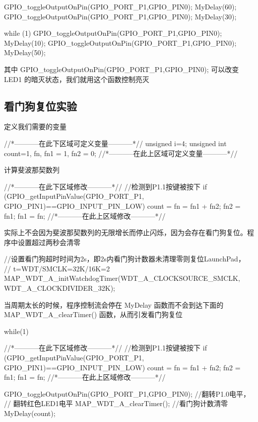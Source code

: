 \documentclass[a4paper,10pt,UTF8]{paper}
\numberwithin{equation}{section}
\numberwithin{figure}{section}
\begin{document}
\begin{ccode}
  GPIO_toggleOutputOnPin(GPIO_PORT_P1,GPIO_PIN0);
    MyDelay(60);
    GPIO_toggleOutputOnPin(GPIO_PORT_P1,GPIO_PIN0);
    MyDelay(30);

  while (1) {
    GPIO_toggleOutputOnPin(GPIO_PORT_P1,GPIO_PIN0);
    MyDelay(10);
    GPIO_toggleOutputOnPin(GPIO_PORT_P1,GPIO_PIN0);
    MyDelay(50);
  }
\end{ccode}

其中 GPIO\_toggleOutputOnPin(GPIO\_PORT\_P1,GPIO\_PIN0); 可以改变 LED1 的暗灭状态，我们就用这个函数控制亮灭

\subsection{看门狗复位实验}

定义我们需要的变量

\begin{ccode}
  //*-----------在此下区域可定义变量-----------*//
    unsigned i=4;
    unsigned int count=1, fn, fn1 = 1, fn2 = 0;
  //*-----------在此上区域可定义变量-----------*//  
\end{ccode}

计算斐波那契数列

\begin{ccode}
  //*-----------在此下区域修改-----------*//
  //检测到P1.1按键被按下
  if (GPIO_getInputPinValue(GPIO_PORT_P1, GPIO_PIN1)==GPIO_INPUT_PIN_LOW)
  {
      count = fn = fn1 + fn2;
      fn2 = fn1;
      fn1 = fn;
  }
  //*-----------在此上区域修改-----------*//
\end{ccode}

实际上不会因为斐波那契数列的无限增长而停止闪烁，因为会存在看门狗复位。程序中设置超过两秒会清零

\begin{ccode}
  //设置看门狗超时时间为2s，即2s内看门狗计数器未清理零则复位LaunchPad，
  // t=WDT/SMCLK=32K/16K=2
    MAP_WDT_A_initWatchdogTimer(WDT_A_CLOCKSOURCE_SMCLK,
    WDT_A_CLOCKDIVIDER_32K);
\end{ccode}

当周期太长的时候，程序控制流会停在 MyDelay 函数而不会到达下面的 MAP\_WDT\_A\_clearTimer() 函数，从而引发看门狗复位

\begin{ccode}
  while(1)
  {
    //*-----------在此下区域修改-----------*//
    //检测到P1.1按键被按下
    if (GPIO_getInputPinValue(GPIO_PORT_P1, GPIO_PIN1)==GPIO_INPUT_PIN_LOW)
    {
      count = fn = fn1 + fn2;
      fn2 = fn1;
      fn1 = fn;
    }
    //*-----------在此上区域修改-----------*//
    
    GPIO_toggleOutputOnPin(GPIO_PORT_P1,GPIO_PIN0); //翻转P1.0电平，
    // 翻转红色LED1电平
    MAP_WDT_A_clearTimer(); //看门狗计数清零
    MyDelay(count);
  }
\end{ccode}
\end{document}
